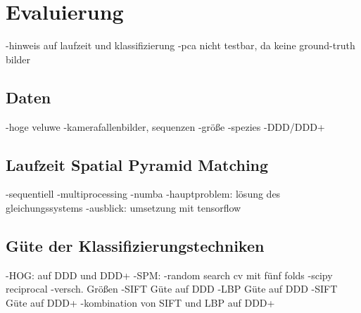 \section{Evaluierung}
\label{sec:eval}

-hinweis auf laufzeit und klassifizierung
-pca nicht testbar, da keine ground-truth bilder

\subsection{Daten}

-hoge veluwe
-kamerafallenbilder, sequenzen
-größe
-spezies
-DDD/DDD+

\subsection{Laufzeit Spatial Pyramid Matching}

-sequentiell
-multiprocessing
-numba
-hauptproblem: lösung des gleichungssystems
-ausblick: umsetzung mit tensorflow

\subsection{Güte der Klassifizierungstechniken}

-HOG: auf DDD und DDD+
-SPM:
	-random search cv mit fünf folds
	-scipy reciprocal
	-versch. Größen
	-SIFT Güte auf DDD
	-LBP Güte auf DDD
	-SIFT Güte auf DDD+
	-kombination von SIFT und LBP auf DDD+
